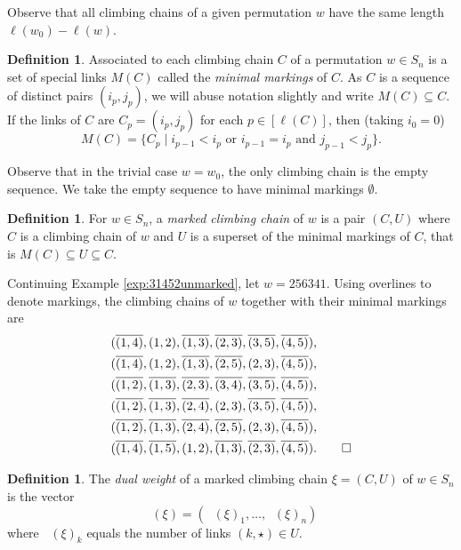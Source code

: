\documentclass[11pt]{amsart}
\theoremstyle{definition}
\newtheorem{definition}[theorem]{Definition}
\newenvironment{example}
{\pushQED{\qed}\renewcommand{\qedsymbol}{$\diamondsuit$}\examplex}
{\popQED\endexamplex}
\theoremstyle{named}
\DeclareMathOperator{\dwt}{\overline{\mathrm{wt}}}
\begin{document}
	Observe that all climbing chains of a given permutation $w$ have the same length $\ell(w_0)-\ell(w)$.
	
	\begin{definition}
		Associated to each climbing chain $C$ of a permutation $w\in S_n$ is a set of special links $M(C)$ called the \emph{minimal markings} of $C$. As $C$ is a sequence of distinct pairs $(i_p,j_p)$, we will abuse notation slightly and write $M(C)\subseteq C$. If the links of $C$ are $C_p=(i_p,j_p)$ for each $p\in [\ell(C)]$, then (taking $i_0=0$)
		\[M(C)=\{C_p \mid i_{p-1}<i_{p} \mbox{ or } i_{p-1}=i_p \mbox{ and } j_{p-1}<j_p\}. \]
	\end{definition}

	Observe that in the trivial case $w=w_0$, the only climbing chain is the empty sequence. We take the empty sequence to have minimal markings $\emptyset$.

	\begin{definition}
		For $w\in S_n$, a \emph{marked climbing chain} of $w$ is a pair $(C,U)$ where $C$ is a climbing chain of $w$ and $U$ is a superset of the minimal markings of $C$, that is $M(C)\subseteq U\subseteq C$.
	\end{definition}

	\begin{example}
		\label{exp:31452marked}
		Continuing Example \ref{exp:31452unmarked}, let $w=256341$. Using overlines to denote markings, the climbing chains of $w$ together with their minimal markings are
		\begin{align*}
			&(\overline{(1,4)},{(1,2)},\overline{(1,3)},\overline{(2,3)},\overline{(3,5)},\overline{(4,5)}),\\
			&(\overline{(1,4)},{(1,2)},\overline{(1,3)},\overline{(2,5)},{(2,3)},\overline{(4,5)}),\\
			&(\overline{(1,2)},\overline{(1,3)},\overline{(2,3)},\overline{(3,4)},\overline{(3,5)},\overline{(4,5)}),\\
			&(\overline{(1,2)},\overline{(1,3)},\overline{(2,4)},{(2,3)},\overline{(3,5)},\overline{(4,5)}),\\
			&(\overline{(1,2)},\overline{(1,3)},\overline{(2,4)},\overline{(2,5)},{(2,3)},\overline{(4,5)}),\\
			&(\overline{(1,4)},\overline{(1,5)},{(1,2)},\overline{(1,3)},\overline{(2,3)},\overline{(4,5)}).\qedhere
		\end{align*}
	\end{example}

	\begin{definition}
		The \emph{dual weight} of a marked climbing chain $\xi=(C,U)$ of $w\in S_n$ is the vector \[\dwt(\xi)=(\dwt(\xi)_1,\ldots,\dwt(\xi)_n) \]
		where $\dwt(\xi)_k$ equals the number of links $(k,\star)\in U$.
	\end{definition}
	
\end{document}
